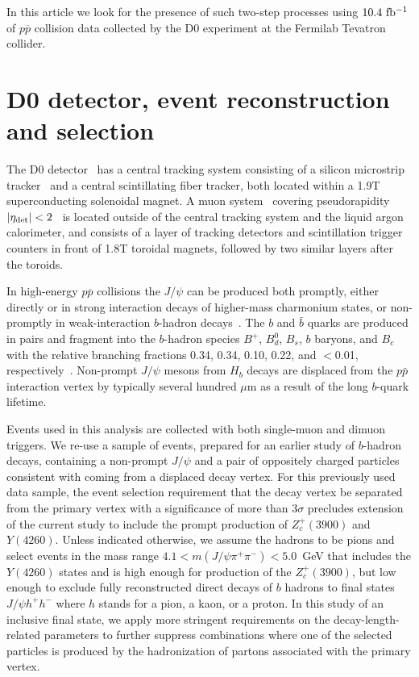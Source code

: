 \documentclass[aps,prd,twocolumn,superscriptaddress,groupedaddress,floatfix]{revtex4}
\begin{document}
In this article   we look for the presence of  such two-step processes 
using  $10.4~\rm{fb^{-1}}$ of $p \overline p $ collision
data  collected by the  D0 experiment at  the Fermilab Tevatron collider.


\section{D0 detector,  event reconstruction  and selection}

The D0 detector~\cite{d0det} has a central tracking system consisting of a silicon
microstrip tracker~\cite{layer0}  and a central scintillating fiber tracker, both located within a
1.9T superconducting solenoidal magnet. A muon
system~\cite{run2muon}  covering pseudorapidity  $|\eta_{\rm det}|<2$~\cite{eta} is 
located  outside of the central tracking system and the liquid argon calorimeter, and
consists of a layer of tracking
detectors and scintillation trigger counters in front of 1.8T toroidal
magnets, followed by two similar layers after the
toroids. 


In high-energy $p \overline p$ collisions the $J/\psi$ can be  produced both 
promptly, either directly or in strong interaction decays of higher-mass charmonium states,
or non-promptly in  weak-interaction $b$-hadron decays~\cite{ua1, cdfrun1, d0run1}.
The $b$ and $\bar b$ quarks are produced in pairs and  fragment into the
$b$-hadron species $B^+$, $B^0_d$, $B_s$, $b$ baryons, and $B_c$ with
 the relative branching fractions
0.34, 0.34, 0.10, 0.22, and $<$0.01, respectively~\cite{pdg}.
Non-prompt $J/\psi$ mesons from $H_b$ decays are displaced from the  $p\bar{p}$  interaction vertex
by typically several hundred $\mu$m 
as a result of the long $b$-quark lifetime.

Events used in this analysis are collected with both single-muon and dimuon triggers.
We re-use a  sample of events, prepared for an earlier study of $b$-hadron decays,
containing a non-prompt $J/\psi$ and a pair of oppositely charged particles
consistent with coming from a displaced decay vertex.
For this previously used data sample, the event selection requirement that the 
decay vertex be
separated from the primary vertex with a significance of  more than
$3\sigma$
 precludes extension of the current  study  to include
 the prompt production of $Z_c^+(3900)$ and $Y(4260)$.
Unless indicated otherwise,  we assume the hadrons to be pions and select events in the mass range
 $4.1<m(J/\psi \pi^+ \pi^-)<5.0$~GeV that includes the $Y(4260)$ states and
is high enough for production of the  $Z_c^+(3900)$, but  low enough to exclude 
fully reconstructed direct
decays of $b$ hadrons to final states  $J/\psi h^+ h^-$
where $h$ stands for a pion, a kaon, or  a proton.
In this study of an inclusive final state, we apply more stringent requirements on the 
decay-length-related parameters to further suppress combinations where one of the selected 
particles is produced by the hadronization of partons associated with the primary vertex.
\end{document}
